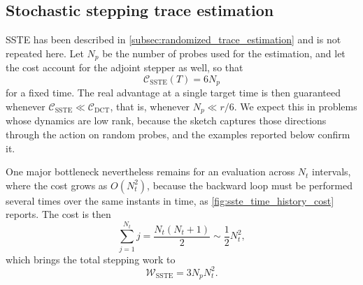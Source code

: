 \subsection{Stochastic stepping trace estimation}
\label{sec:appendix_sste_method}

SSTE has been described in \cref{subsec:randomized_trace_estimation} and is not repeated here. Let
\(N_p\) be the number of probes used for the estimation, and let the cost account for the adjoint
stepper as well, so that
\begin{equation}
  \mathcal{C}_{\mathrm{SSTE}}(T)=6N_p
  \label{eq:sste_fixed_time_cost}
\end{equation}
for a fixed time. The real advantage at a single target time is then guaranteed whenever
\(\mathcal{C}_{\mathrm{SSTE}}\ll\mathcal{C}_{\mathrm{DCT}}\), that is, whenever \(N_p\ll r/6\). We
expect this in problems whose dynamics are low rank, because the sketch captures those directions
through the action on random probes, and the examples reported below confirm it.

One major bottleneck nevertheless remains for an evaluation across \(N_t\) intervals, where the
cost grows as \(O(N_t^{2})\), because the backward loop must be performed several times over the
same instants in time, as \cref{fig:sste_time_history_cost} reports. The cost is then
\begin{equation}
  \sum_{j=1}^{N_t} j
  =
  \frac{N_t(N_t+1)}{2}
  \sim
  \frac{1}{2}N_t^{2},
  \label{eq:sste_backward_sum}
\end{equation}
which brings the total stepping work to
\begin{equation}
  \mathcal{W}_{\mathrm{SSTE}}=3N_pN_t^{2}.
  \label{eq:sste_multiple_time_cost}
\end{equation}

